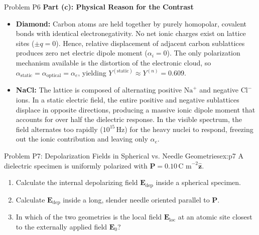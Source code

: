 \documentclass[11pt,a4paper]{article}
\begin{document}
\begin{solbox}{Problem P6}
\textbf{Part (c): Physical Reason for the Contrast} \\
\begin{itemize}
    \item \textbf{Diamond:} Carbon atoms are held together by purely homopolar, covalent bonds with identical electronegativity. No net ionic charges exist on lattice sites ($\pm q = 0$). Hence, relative displacement of adjacent carbon sublattices produces zero net electric dipole moment ($\alpha_i = 0$). The only polarization mechanism available is the distortion of the electronic cloud, so $\alpha_{\text{static}} = \alpha_{\text{optical}} = \alpha_e$, yielding $Y^{(\text{static})} \approx Y^{(n)} = 0.609$.
    \item \textbf{NaCl:} The lattice is composed of alternating positive $\text{Na}^+$ and negative $\text{Cl}^-$ ions. In a static electric field, the entire positive and negative sublattices displace in opposite directions, producing a massive ionic dipole moment that accounts for over half the dielectric response. In the visible spectrum, the field alternates too rapidly ($10^{15}\,\text{Hz}$) for the heavy nuclei to respond, freezing out the ionic contribution and leaving only $\alpha_e$.
\end{itemize}
\end{solbox}

\newpage

\begin{examplebox}{Problem P7: Depolarization Fields in Spherical vs. Needle Geometries}{ex:p7}
A dielectric specimen is uniformly polarized with $\mathbf{P} = 0.10\,\text{C m}^{-2}\hat{\mathbf{z}}$.
\begin{enumerate}[label=(\alph*), leftmargin=*]
    \item Calculate the internal depolarizing field $\mathbf{E}_{\text{dep}}$ inside a spherical specimen.
    \item Calculate $\mathbf{E}_{\text{dep}}$ inside a long, slender needle oriented parallel to $\mathbf{P}$.
    \item In which of the two geometries is the local field $\mathbf{E}_{\text{loc}}$ at an atomic site closest to the externally applied field $\mathbf{E}_0$?
\end{enumerate}
\end{examplebox}
\end{document}
